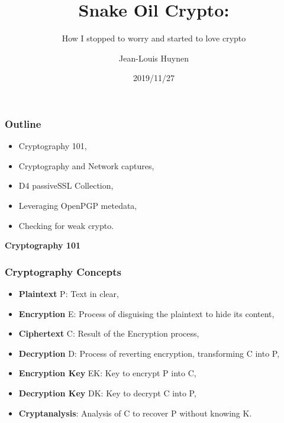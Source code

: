 \documentclass{beamer}
\title{Snake Oil Crypto:}
\subtitle{How I stopped to worry and started to love crypto}
\author{Jean-Louis Huynen}
\institute{Team CIRCL \\ \url{https://www.d4-project.org/}}
\date{2019/11/27}
\begin{document}
    \begin{frame}
        \maketitle
    \end{frame}

\begin{frame}
        \frametitle{Outline}

        \begin{itemize}
          \item Cryptography 101,
          \item Cryptography and Network captures,
          \item D4 passiveSSL Collection,
          \item Leveraging OpenPGP metedata,
          \item Checking for weak crypto.
        \end{itemize}

\end{frame}

\begin{frame}
  \begin{center}
    {\bf Cryptography 101}
  \end{center}
\end{frame}


\begin{frame}
  \frametitle{Cryptography Concepts}
        \begin{itemize}
          \item {\bf Plaintext} P: Text in clear,
          \item {\bf Encryption} E: Process of disguising the plaintext to hide its content,
          \item {\bf Ciphertext} C: Result of the Encryption process,
          \item {\bf Decryption} D: Process of reverting encryption, transforming C
            into P,
          \item {\bf Encryption Key} EK: Key to encrypt P into C,
          \item {\bf Decryption Key} DK: Key to decrypt C into P,
          \item {\bf Cryptanalysis}: Analysis of C to recover P without knowing K.
        \end{itemize}

\end{frame}
\end{document}
